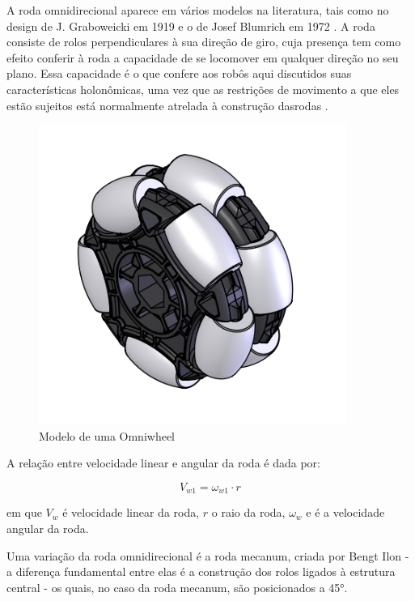 A roda omnidirecional aparece em vários modelos na literatura, tais como no design de J. Graboweicki em 1919
\cite{patent_US1305535A} e o de Josef Blumrich em 1972 \cite{patent_US3789947A}. A roda consiste de rolos
perpendiculares à  sua direção de giro, cuja presença tem como efeito conferir à roda a capacidade de se locomover em
qualquer direção no seu plano. Essa capacidade é o que confere aos robôs aqui discutidos suas características
holonômicas, uma vez que as restrições de movimento a que eles estão sujeitos está normalmente atrelada à construção dasrodas \cite{TAKAHASHI}.

\begin{figure}[h]
	\centering
	\includegraphics{figures/omniwheel}
	\caption{Modelo de uma Omniwheel \cite{draw_omniwheel}}
\end{figure}

A relação entre velocidade linear e angular da roda é dada por:

\[V_{w1} = \omega_{w1}\cdot r \] 

em que $V_{w}$ é velocidade linear da roda, $r$ o raio da roda, $\omega_{w} $ e é a velocidade angular da roda.

Uma variação da roda omnidirecional é a roda mecanum, criada por Bengt Ilon \cite{patent_US3876255A} - a diferença fundamental entre elas é a construção dos rolos ligados à estrutura central  - os quais, no caso da roda mecanum, são posicionados a 45°.

